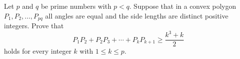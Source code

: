 Let $p$ and $q$ be prime numbers with $p<q$. Suppose that in a convex polygon $P_1,P_2,…,P_{pq}$ all angles are equal and the side lengths are distinct positive integers. Prove that
$$P_1P_2+P_2P_3+\cdots +P_kP_{k+1}\geqslant \frac{k^3+k}{2}$$holds for every integer $k$ with $1\leqslant k\leqslant p$.

